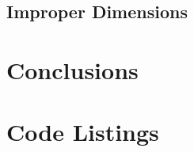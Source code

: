 \documentclass[12pt]{article}
\begin{document}
\subsection{Improper Dimensions}



\section{Conclusions}



\appendix %
\newpage

\section{Code Listings}\label{code}

%
% 
%
%
%



\newpage  %



\end{document}
